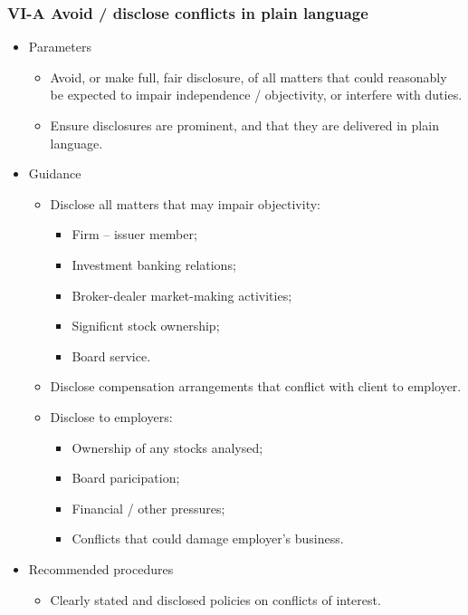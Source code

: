 \documentclass[../notes_compiled.tex]{subfiles}
\begin{document}
\subsubsection{VI-A Avoid / disclose conflicts in plain language}
\begin{itemize}
\item Parameters
\begin{itemize}
\item Avoid, or make full, fair disclosure, of all matters that could reasonably be expected to impair independence / objectivity, or interfere with duties.
\item Ensure disclosures are prominent, and that they are delivered in plain language.
\end{itemize}
\item Guidance
\begin{itemize}
\item Disclose all matters that may impair objectivity:
\begin{itemize}
\item Firm -- issuer member;
\item Investment banking relations;
\item Broker-dealer market-making activities;
\item Significnt stock ownership;
\item Board service.
\end{itemize}
\item Disclose compensation arrangements that conflict with client to employer.
\item Disclose to employers:
\begin{itemize}
\item Ownership of any stocks analysed;
\item Board paricipation;
\item Financial / other pressures;
\item Conflicts that could damage employer’s business.
\end{itemize}
\end{itemize}
\item Recommended procedures
\begin{itemize}
\item Clearly stated and disclosed policies on conflicts of interest.
\end{itemize}
\end{itemize}
\end{document}
